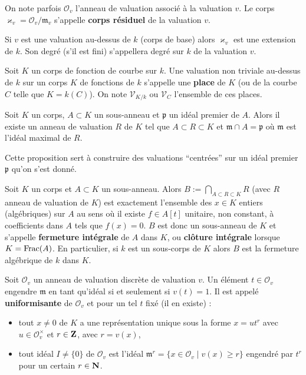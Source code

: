 	\begin{defn}
		On note parfois $\mathcal{O}_v$ l'anneau de valuation associé à la valuation $v$.
		Le corps $\varkappa_v = \mathcal{O}_v / \mathfrak{m}_v$ s'appelle \textbf{corps résiduel} de la valuation $v$.
	\end{defn}

	\begin{pop}
		Si $v$ est une valuation au-dessus de $k$ (corps de base) alors $\varkappa_v$ est une extension de $k$.
		Son degré (s'il est fini) s'appellera degré sur $k$ de la valuation $v$.
	\end{pop}

	\begin{defn}
		Soit $K$ un corps de fonction de courbe sur $k$.
		Une valuation non triviale au-dessus de $k$ sur un corps $K$ de fonctions de $k$ s'appelle une \textbf{place} de $K$ (ou de la courbe $C$ telle que $K = k(C)$).
		On note $\mathscr{V}_{K/k}$ ou $\mathscr{V}_C$ l'ensemble de ces places.
	\end{defn}

	\begin{pop}
		Soit $K$ un corps, $A \subset K$ un sous-anneau et $\mathfrak{p}$ un idéal premier de $A$.
		Alors il existe un anneau de valuation $R$ de $K$ tel que $A \subset R \subset K$ et $\mathfrak{m} \cap A = \mathfrak{p}$ où $\mathfrak{m}$ est l'idéal maximal de $R$.
	\end{pop}

	Cette proposition sert à construire des valuations “centrées” sur un idéal premier $\mathfrak{p}$ qu'on s'est donné.
	
	\begin{pop}
		Soit $K$ un corps et $A \subset K$ un sous-anneau.
		Alors $B := \bigcap_{A \subset R \subset K} R$ (avec $R$ anneau de valuation de $K$) est exactement l'ensemble des $x \in K$ entiers (algébriques) sur $A$ au sens où il existe $f \in A[t]$ unitaire, non constant, à coefficients dans $A$ tels que $f(x) = 0$.
		$B$ est donc un sous-anneau de $K$ et s'appelle \textbf{fermeture intégrale} de $A$ dans $K$, ou \textbf{clôture intégrale} lorsque $K = \operatorname{Frac}(A)$.
		En particulier, si $k$ est un sous-corps de $K$ alors $B$ est la fermeture algébrique de $k$ dans $K$.
	\end{pop}

	\begin{pop}
		Soit $\mathcal{O}_v$ un anneau de valuation discrète de valuation $v$.
		Un élément $t \in \mathcal{O}_v$ engendre $\mathfrak{m}$ en tant qu'idéal si et seulement si $v(t) = 1$.
		Il est appelé \textbf{uniformisante} de $\mathcal{O}_v$ et pour un tel $t$ fixé (il en existe) :
		\begin{itemize}
			\item[\textbullet] tout $x \neq 0$ de $K$ a une représentation unique sous la forme $x = u t^r$ avec $u \in \mathcal{O}_v^\times$ et $r \in \mathbf{Z}$, avec $r = v(x)$,
			\item[\textbullet] tout idéal $I \neq \{ 0 \}$ de $\mathcal{O}_v$ est l'idéal $\mathfrak{m}^r = \{ x \in \mathcal{O}_v \mid v(x) \geq r \}$ engendré par $t^r$ pour un certain $r \in \mathbf{N}$.
		\end{itemize}
	\end{pop}


